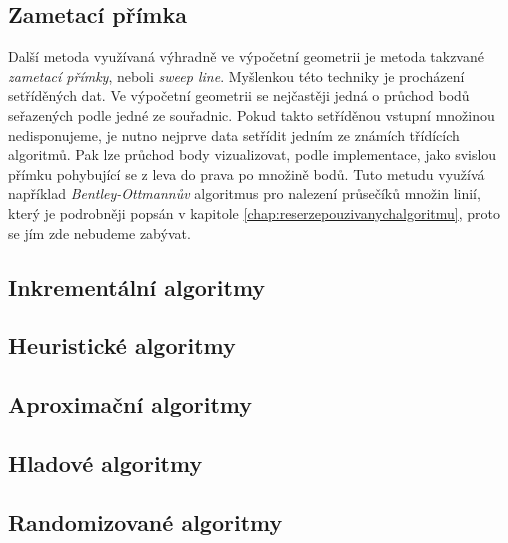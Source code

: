 \subsection{Zametací přímka}
	Další metoda využívaná výhradně ve výpočetní geometrii je metoda takzvané \textit{zametací přímky}, neboli \textit{sweep line}. Myšlenkou této techniky je procházení setříděných dat. Ve výpočetní geometrii se nejčastěji jedná o průchod bodů seřazených podle jedné ze souřadnic. Pokud takto setříděnou vstupní množinou nedisponujeme, je nutno nejprve data setřídit jedním ze známích třídících algoritmů. Pak lze průchod body vizualizovat, podle implementace, jako svislou přímku pohybující se z leva do prava po množině bodů.
	Tuto metudu využívá například \textit{Bentley-Ottmannův} algoritmus pro nalezení průsečíků množin linií, který je podrobněji popsán v kapitole \ref{chap:reserzepouzivanychalgoritmu}, proto se jím zde nebudeme zabývat.







\subsection{Inkrementální algoritmy}


\subsection{Heuristické algoritmy}

\subsection{Aproximační algoritmy}

\subsection{Hladové algoritmy}

\subsection{Randomizované algoritmy}















